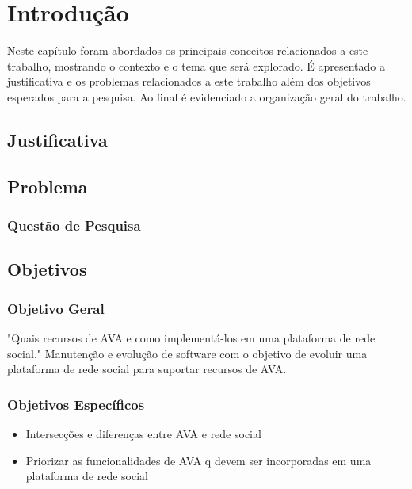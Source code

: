 \chapter{Introdução}
\label{cap-introducao}
Neste capítulo foram abordados os principais conceitos relacionados a este trabalho, mostrando o contexto e o tema que será explorado. É apresentado a justificativa e os problemas relacionados a este trabalho além dos objetivos esperados para a pesquisa. Ao final é evidenciado a organização geral do trabalho.

\section{Justificativa}


\section{Problema}


\subsection{Questão de Pesquisa}

 
\section{Objetivos}

\subsection{Objetivo Geral}

"Quais recursos de AVA e como implementá-los em uma plataforma de rede social."
Manutenção e evolução de software com o objetivo de evoluir uma plataforma de rede social para suportar recursos de AVA.

\subsection{Objetivos Específicos}

\begin{itemize}
\item Intersecções  e diferenças entre AVA e rede social
\item Priorizar as funcionalidades de AVA q devem ser incorporadas em uma plataforma de rede social
\end{itemize}

